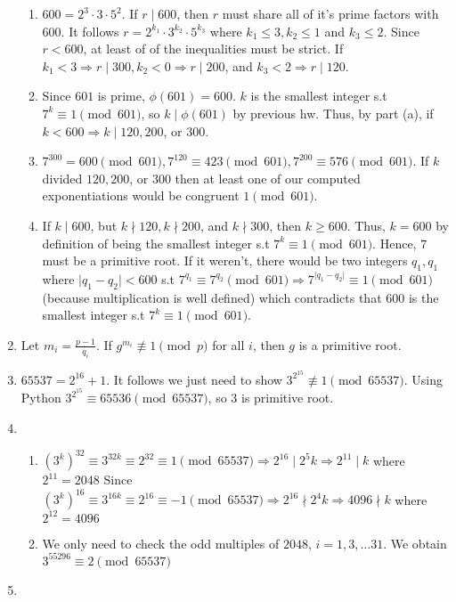 \documentclass[10pt]{article}
\begin{document}
\begin{enumerate}[label= \arabic*.]
\begin{enumerate}
    \item $600=2^3\cdot 3\cdot 5^2$. If $r\mid 600$, then $r$ must share all of it's prime factors with $600$. 
    It follows $r=2^{k_1}\cdot 3^{k_2}\cdot 5^{k_3}$ where $k_1\le 3,k_2\le 1$ and $k_3\le 2$.
    Since $r<600$, at least of of the inequalities must be strict.
    If $k_1<3\Rightarrow r\mid 300,k_2<0\Rightarrow r\mid 200$, and $k_3<2\Rightarrow r\mid 120$.
    \item Since $601$ is prime, $\phi(601)=600$. $k$ is the smallest integer s.t $7^k\equiv 1\pmod{601}$, so $k\mid \phi(601)$ by previous hw. Thus, by part (a), if $k<600\Rightarrow k\mid 120,200$, or $300$.
    \item $7^{300}=600\pmod{601},7^{120}\equiv 423\pmod{601},7^{200}\equiv 576\pmod{601}$. 
    If $k$ divided $120,200$, or $300$ then at least one of our computed exponentiations would be congruent $1\pmod{601}$. 
    \item If $k\mid 600$, but $k\nmid 120,k\nmid 200$, and $k\nmid 300$, then $k\ge 600$. 
    Thus, $k=600$ by definition of being the smallest integer s.t $7^k\equiv 1\pmod{601}$.
    Hence, $7$ must be a primitive root.
    If it weren't, there would be two integers $q_1,q_1$ where $\lvert q_1-q_2\rvert<600$ s.t $7^{q_1}\equiv 7^{q_2}\pmod{601}\Rightarrow 7^{\lvert q_1-q_2\rvert}\equiv 1\pmod{601}$ (because multiplication is well defined) which contradicts that $600$ is the smallest integer s.t $7^k\equiv 1\pmod{601}$.
\end{enumerate}
\item Let $m_i=\frac{p-1}{q_i}$. If $g^{m_i}\not\equiv 1\pmod{p}$ for all $i$, then $g$ is a primitive root. 
\item $65537=2^{16}+1$. It follows we just need to show $3^{2^{15}}\not\equiv 1\pmod{65537}$. Using Python $3^{2^{15}}\equiv 65536\pmod{65537}$, so $3$ is primitive root.
\item \begin{enumerate}
    \item ${(3^k)}^{32}\equiv 3^{32k}\equiv 2^{32}\equiv 1\pmod{65537}\Rightarrow 2^{16}\mid 2^5k\Rightarrow 2^{11}\mid k$ where $2^{11}=2048$ Since ${(3^k)}^{16}\equiv 3^{16k}\equiv 2^{16}\equiv -1\pmod{65537}\Rightarrow 2^{16}\nmid 2^4k\Rightarrow 4096\nmid k$ where $2^{12}=4096$
    \item We only need to check the odd multiples of $2048$, $i=1,3,\ldots 31$. We obtain $3^{55296}\equiv 2\pmod{65537}$ 
\end{enumerate}
\item \begin{enumerate}

\end{enumerate}
\end{enumerate}
\end{document}
